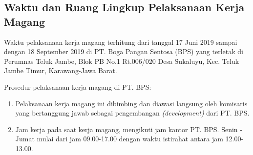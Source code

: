 \subsection{Waktu dan Ruang Lingkup Pelaksanaan Kerja Magang}

Waktu pelaksanaan kerja magang terhitung dari tanggal 
17 Juni 2019 sampai dengan 18 September 2019 di 
PT. Boga Pangan Sentosa (BPS) yang terletak di 
Perumnas Teluk Jambe, Blok PB No.1 Rt.006/020 Desa Sukaluyu, 
Kec. Teluk Jambe Timur, Karawang-Jawa Barat.

\noindent Prosedur pelaksanaan kerja magang di PT. BPS:
\nolinebreak
\begin{enumerate}
\item Pelaksanaan kerja magang ini dibimbing dan diawasi langsung oleh komisaris yang 
bertanggung jawab sebagai pengembangan \emph{(development)} dari PT. BPS. 
\item Jam kerja pada saat kerja magang, mengikuti jam kantor PT. BPS. 
Senin - Jumat mulai dari jam 09.00-17.00 dengan waktu istirahat antara jam 12.00-13.00. 
\end{enumerate}